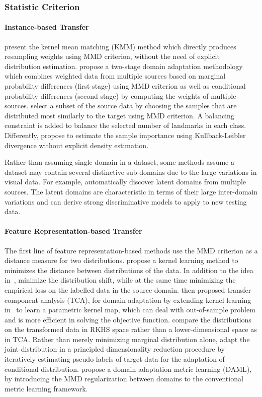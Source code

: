 \documentclass[prodmode]{acmsmall}  %
\begin{document}
\subsubsection{Statistic Criterion}
\paragraph{Instance-based Transfer}
 present the kernel mean matching (KMM) method which directly produces resampling weights using MMD criterion, without the need of explicit distribution estimation.  propose a two-stage domain adaptation methodology which combines weighted data from multiple sources based on marginal probability differences (first stage) using MMD criterion as well as conditional probability differences (second stage) by computing the weights of multiple sources.  select a subset of the source data by choosing the samples that are distributed most similarly to the target using MMD criterion. A balancing constraint is added to balance the selected number of landmarks in each class. Differently,  propose to estimate the sample importance using Kullback-Leibler divergence without explicit density estimation.

Rather than assuming single domain in a dataset, some methods assume a dataset may contain several distinctive sub-domains due to the large variations in visual data. For example,  automatically discover latent domains from multiple sources. The latent domains are characteristic in terms of their large inter-domain variations and can derive strong discriminative models to apply to new testing data.
\paragraph{Feature Representation-based Transfer} 
The first line of feature representation-based methods use the MMD criterion as a distance measure for two distributions.  propose a kernel learning method to minimizes the distance between distributions of the data. In addition to the idea in~\cite{Pan2008},  minimize the distribution shift, while at the same time minimizing the empirical loss on the labelled data in the source domain.  then proposed transfer component analysis (TCA), for domain adaptation by extending kernel learning in~\cite{Pan2008} to learn a parametric kernel map, which can deal with out-of-sample problem and is more efficient in solving the objective function.  compare the distributions on the transformed data in RKHS space rather than a lower-dimensional space as in TCA. 
Rather than merely minimizing marginal distribution alone,  adapt the joint distribution in a principled dimensionality reduction procedure by iteratively estimating pseudo labels of target data for the adaptation of conditional distribution. 
 propose a domain adaptation metric learning (DAML), by introducing the MMD regularization between domains to the conventional metric learning framework. 
\end{document}
